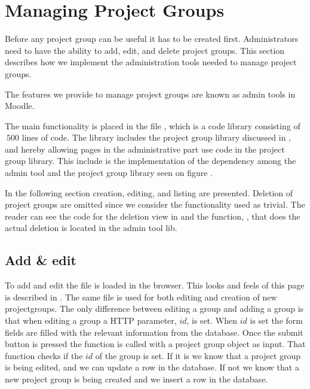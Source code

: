\section{Managing Project Groups} %
\label{sec:manProjGrpImpl}
Before any project group can be useful it has to be created first.
Administrators need to have the ability to add, edit, and delete project groups.
This section describes how we implement the administration tools needed to manage project groups.

The features we provide to manage project groups are known as admin tools in Moodle.

The main functionality is placed in the file , which is a code library consisting of $~500$ lines of code. 
The library includes the project group library discussed in , and hereby allowing pages in the administrative part use code in the project group library. 
This include is the implementation of the dependency among the admin tool and the project group library seen on figure . 

In the following section creation, editing, and listing are presented. 
Deletion of project groups are omitted since we consider the functionality used as trivial. 
The reader can see the code for the deletion view in  and the function, , that does the actual deletion is located in the admin tool lib.

\subsection{Add \& edit}
To add and edit the file  is loaded in the browser. 
This looks and feels of this page is described in .
The same file is used for both editing and creation of new projectgroups. 
The only difference between editing a group and adding a group is that when editing a group a HTTP parameter, $id$, is set.
When $id$ is set the form fields are filled with the relevant information from the database.
Once the submit button is pressed the function  is called with a project group object as input.
That function checks if the $id$ of the group is set. 
If it is we know that a project group is being edited, and we can update a row in the database.
If not we know that a new project group is being created and we insert a row in the database.


